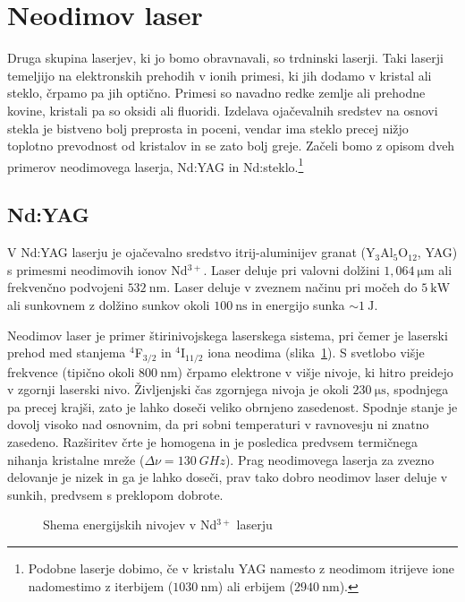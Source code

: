 \section{Neodimov laser}
Druga skupina laserjev, ki jo bomo obravnavali, so trdninski laserji. Taki laserji
temeljijo na elektronskih prehodih v ionih primesi, ki jih dodamo v kristal ali steklo,
črpamo pa jih optično. Primesi so navadno redke zemlje ali prehodne kovine, 
kristali pa so oksidi ali fluoridi. Izdelava ojačevalnih sredstev na osnovi stekla
je bistveno bolj preprosta in poceni, vendar ima steklo precej nižjo toplotno prevodnost
od kristalov in se zato bolj greje. 
Začeli bomo z opisom dveh primerov neodimovega laserja, Nd:YAG in Nd:steklo.\footnote{
Podobne laserje dobimo, če v kristalu YAG namesto z neodimom itrijeve ione 
nadomestimo z iterbijem ($1030~\si{\nano\metre}$) ali 
erbijem ($2940~\si{\nano\metre}$).}

\subsection{Nd:YAG}
V Nd:YAG laserju je ojačevalno sredstvo
itrij-aluminijev granat (Y$_3$Al$_5$O$_{12}$, YAG) s primesmi neodimovih ionov Nd$^{3+}$. 
Laser deluje pri valovni dolžini $1,064~\si{\micro\meter}$ ali frekvenčno podvojeni
$532~\si{\nano\metre}$. Laser deluje v zveznem 
načinu pri močeh do $5~\si{\kilo\watt}$ ali sunkovnem z dolžino sunkov okoli 
$100~\si{\nano\second}$ in energijo sunka $\sim 1~\si{\joule}$.

Neodimov laser je primer štirinivojskega laserskega sistema, 
pri čemer je 
laserski prehod med stanjema $^4$F$_{3/2}$ in $^4$I$_{11/2}$ iona neodima 
(slika~\ref{fig:NdE}). S svetlobo višje frekvence 
(tipično okoli $800~\si{\nano\metre}$) črpamo elektrone v višje nivoje, ki hitro 
preidejo v zgornji laserski nivo. Življenjski čas zgornjega nivoja je 
okoli $230~\si{\micro\second}$, spodnjega pa precej krajši, zato je 
lahko doseči veliko obrnjeno zasedenost. Spodnje stanje je dovolj visoko nad 
osnovnim, da pri sobni temperaturi v ravnovesju ni znatno zasedeno. 
Razširitev črte je homogena in je posledica predvsem 
termičnega nihanja kristalne mreže ($\Delta \nu = 130~\si{GHz}$). 
Prag neodimovega laserja za zvezno delovanje je nizek in ga je lahko doseči, 
prav tako dobro neodimov laser deluje v sunkih, predvsem s preklopom dobrote.
\begin{figure}[h]
\centering
\def\svgwidth{85truemm} 

\caption{Shema energijskih nivojev v Nd$^{3+}$ laserju}
\label{fig:NdE}
\end{figure}

